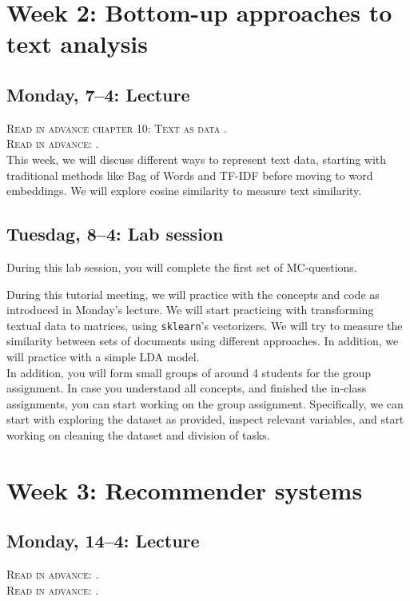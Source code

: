 \section*{Week 2:  Bottom-up approaches to text analysis}

\subsection*{Monday, 7--4: Lecture}

\textsc{Read in advance chapter 10: Text as data \cite{van_atteveldt_computational_2022}.} \\
\textsc{Read in advance: \cite{Brinberg2021}.} \\

This week, we will discuss different ways to represent text data, starting with traditional methods like Bag of Words and TF-IDF before moving to word embeddings. We will explore cosine similarity to measure text similarity. 

\subsection*{Tuesdag, 8--4: Lab session}
During this lab session, you will complete the first set of MC-questions. 

During this tutorial meeting, we will practice with the concepts and code as introduced in Monday's lecture.  We will start practicing with transforming textual data to matrices, using  \texttt{sklearn}'s vectorizers. We will try to measure the similarity between sets of documents using different approaches. In addition, we will practice with a simple LDA model. \\

In addition, you will form small groups of around 4 students for the group assignment. In case you understand all concepts, and finished the in-class assignments, you can start working on the group assignment. Specifically, we can start with exploring the dataset as provided, inspect relevant variables, and start working on cleaning the dataset and division of tasks. 

\section*{Week 3: Recommender systems}

\subsection*{Monday, 14--4: Lecture}
\textsc{ Read in advance: \cite{Moller2018}.}\\
\textsc{ Read in advance: \cite{Loecherbach2020}.}\\

